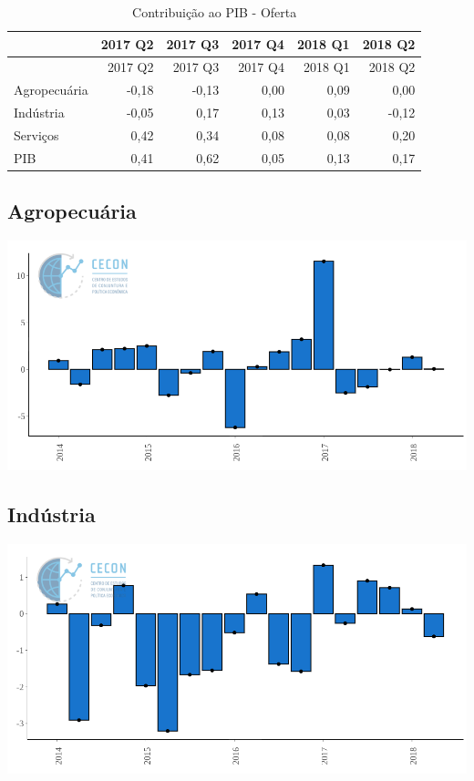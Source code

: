 \documentclass[11pt,portuguese,]{article}
\begin{document}
\begin{longtable}[]{@{}lrrrrr@{}}
\caption{Contribuição ao PIB - Oferta}\tabularnewline
\toprule
& 2017 Q2 & 2017 Q3 & 2017 Q4 & 2018 Q1 & 2018 Q2\tabularnewline
\midrule
\endfirsthead
\toprule
& 2017 Q2 & 2017 Q3 & 2017 Q4 & 2018 Q1 & 2018 Q2\tabularnewline
\midrule
\endhead
Agropecuária & -0,18 & -0,13 & 0,00 & 0,09 & 0,00\tabularnewline
Indústria & -0,05 & 0,17 & 0,13 & 0,03 & -0,12\tabularnewline
Serviços & 0,42 & 0,34 & 0,08 & 0,08 & 0,20\tabularnewline
PIB & 0,41 & 0,62 & 0,05 & 0,13 & 0,17\tabularnewline
\bottomrule
\end{longtable}

\subsection{Agropecuária}\label{agropecuaria}

\begin{center}\includegraphics[width=1\linewidth]{Grafico_Agro} \end{center}

\subsection{Indústria}\label{industria}

\begin{center}\includegraphics[width=1\linewidth]{Grafico_Industria} \end{center}
\end{document}
